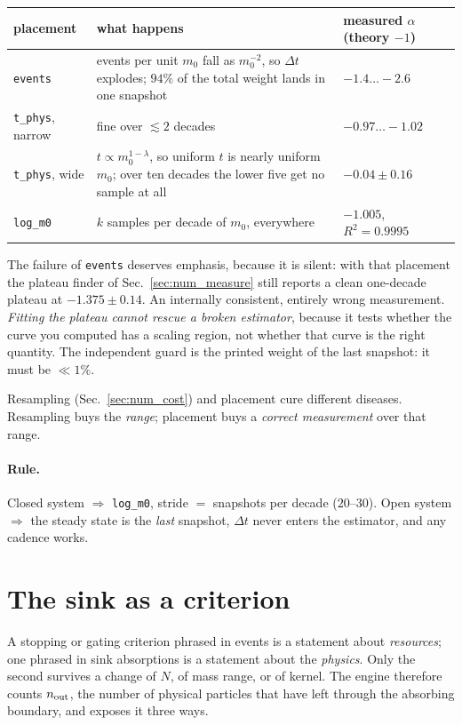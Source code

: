 \documentclass[a4paper,12pt]{article}
\newcommand{\code}[1]{\texttt{#1}}
\begin{document}
\begin{center}
\small
\begin{tabular}{@{}l p{7.2cm} l@{}}
\toprule
placement & what happens & measured $\alpha$ (theory $-1$) \\
\midrule
\code{events} & events per unit $m_0$ fall as $m_0^{-2}$, so $\Delta t$
  explodes; $94\%$ of the total weight lands in one snapshot
  & $-1.4 \ldots -2.6$ \\
\code{t\_phys}, narrow & fine over $\lesssim 2$ decades & $-0.97 \ldots -1.02$ \\
\code{t\_phys}, wide & $t \propto m_0^{1-\lambda}$, so uniform $t$ is nearly
  uniform $m_0$; over ten decades the lower five get no sample at all
  & $-0.04 \pm 0.16$ \\
\code{log\_m0} & $k$ samples per decade of $m_0$, everywhere
  & $\mathbf{-1.005}$, $R^2 = 0.9995$ \\
\bottomrule
\end{tabular}
\end{center}

The failure of \code{events} deserves emphasis, because it is silent: with
that placement the plateau finder of Sec.~\ref{sec:num_measure} still reports
a clean one-decade plateau at $-1.375 \pm 0.14$. An internally consistent,
entirely wrong measurement. \emph{Fitting the plateau cannot rescue a broken
estimator}, because it tests whether the curve you computed has a scaling
region, not whether that curve is the right quantity. The independent guard
is the printed weight of the last snapshot: it must be $\ll 1\%$.

Resampling (Sec.~\ref{sec:num_cost}) and placement cure different diseases.
Resampling buys the \emph{range}; placement buys a \emph{correct
measurement} over that range.

\paragraph{Rule.} Closed system $\Rightarrow$ \code{log\_m0}, stride $=$
snapshots per decade ($20$--$30$). Open system $\Rightarrow$ the steady state
is the \emph{last} snapshot, $\Delta t$ never enters the estimator, and any
cadence works.

\section{The sink as a criterion}
\label{sec:num_sink}

A stopping or gating criterion phrased in events is a statement about
\emph{resources}; one phrased in sink absorptions is a statement about the
\emph{physics}. Only the second survives a change of $N$, of mass range, or
of kernel. The engine therefore counts $n_{\rm out}$, the number of physical
particles that have left through the absorbing boundary, and exposes it
three ways.
\end{document}
